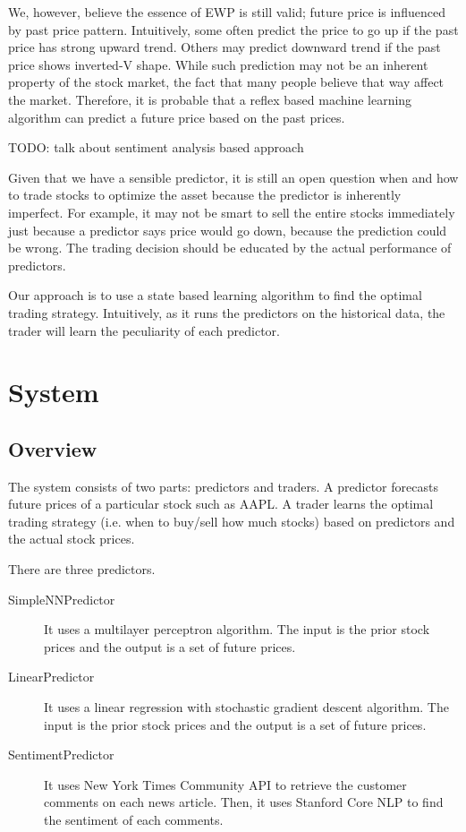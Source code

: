 \documentclass[12pt]{article}
\begin{document}
We, however, believe the essence of EWP is still valid; future price
is influenced by past price pattern. Intuitively, some often predict
the price to go up if the past price has strong upward trend. Others
may predict downward trend if the past price shows inverted-V
shape. While such prediction may not be an inherent property of the
stock market, the fact that many people believe that way affect the
market. Therefore, it is probable that a reflex based machine learning
algorithm can predict a future price based on the past prices.

TODO: talk about sentiment analysis based approach

Given that we have a sensible predictor, it is still an open question
when and how to trade stocks to optimize the asset because the
predictor is inherently imperfect. For example, it may not be smart to
sell the entire stocks immediately just because a predictor says price
would go down, because the prediction could be wrong. The trading
decision should be educated by the actual performance of predictors.

Our approach is to use a state based learning algorithm to find the
optimal trading strategy. Intuitively, as it runs the predictors on
the historical data, the trader will learn the peculiarity of each
predictor. 


\section{System}

\subsection{Overview}

The system consists of two parts: predictors and traders. A predictor
forecasts future prices of a particular stock such as AAPL. A trader
learns the optimal trading strategy (i.e. when to buy/sell how much
stocks) based on predictors and the actual stock prices.

There are three predictors.

\begin{description}
  \item[SimpleNNPredictor] It uses a multilayer perceptron
    algorithm. The input is the prior stock prices and the output is a
    set of future prices.
  \item[LinearPredictor] It uses a linear regression with stochastic
    gradient descent algorithm. The input is the prior stock prices
    and the output is a set of future prices.
  \item[SentimentPredictor] It uses New York Times Community API
    \cite{web:nytimes_community_api}to retrieve the customer comments
    on each news article. Then, it uses Stanford Core NLP
    \cite{manning-EtAl:2014:P14-5} to find the sentiment of each
    comments.
\end{description}
\end{document}
